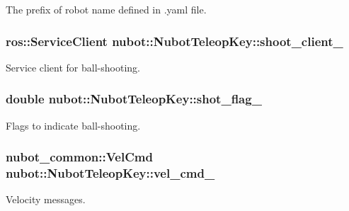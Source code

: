 The prefix of robot name defined in .yaml file. 

\hypertarget{classnubot_1_1NubotTeleopKey_a944cfba55efc7f7ef7ed9acd17c7f676}{
\subsubsection[{shoot\-\_\-client\-\_\-}]{\setlength{\rightskip}{0pt plus 5cm}ros\-::\-Service\-Client nubot\-::\-Nubot\-Teleop\-Key\-::shoot\-\_\-client\-\_\-}}\label{classnubot_1_1NubotTeleopKey_a944cfba55efc7f7ef7ed9acd17c7f676}


Service client for ball-\/shooting. 

\hypertarget{classnubot_1_1NubotTeleopKey_a90a481a3a66e64083a27945def47f4ae}{
\subsubsection[{shot\-\_\-flag\-\_\-}]{\setlength{\rightskip}{0pt plus 5cm}double nubot\-::\-Nubot\-Teleop\-Key\-::shot\-\_\-flag\-\_\-\hspace{0.3cm}{\ttfamily [private]}}}\label{classnubot_1_1NubotTeleopKey_a90a481a3a66e64083a27945def47f4ae}


Flags to indicate ball-\/shooting. 

\hypertarget{classnubot_1_1NubotTeleopKey_a7c70e3f5f30f940e9c508deb84f23da5}{
\subsubsection[{vel\-\_\-cmd\-\_\-}]{\setlength{\rightskip}{0pt plus 5cm}nubot\-\_\-common\-::\-Vel\-Cmd nubot\-::\-Nubot\-Teleop\-Key\-::vel\-\_\-cmd\-\_\-\hspace{0.3cm}{\ttfamily [private]}}}\label{classnubot_1_1NubotTeleopKey_a7c70e3f5f30f940e9c508deb84f23da5}


Velocity messages. 

